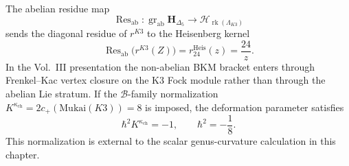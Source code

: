 \begin{remark}
The abelian residue map
\[
\operatorname{Res}_{\mathrm{ab}}\colon
\operatorname{gr}_{\mathrm{ab}}\mathbf H_{\Delta_5}
\longrightarrow \mathcal H_{\operatorname{rk}(\Lambda_{K3})}
\]
sends the diagonal residue of $r^{K3}$ to the Heisenberg kernel
\[
\operatorname{Res}_{\mathrm{ab}}\bigl(r^{K3}(Z)\bigr)
=r^{\mathrm{Heis}}_{24}(z)=\frac{24}{z}.
\]
In the Vol.~III presentation the non-abelian BKM bracket enters
through Frenkel--Kac vertex closure on the K3 Fock module rather than
through the abelian Lie stratum.  If
the $\mathcal B$-family normalization
$K^{\kappa_{\mathrm{ch}}}=2c_+(\mathrm{Mukai}(K3))=8$ is imposed, the
deformation parameter satisfies
\[
\hbar^2 K^{\kappa_{\mathrm{ch}}}=-1,
\qquad
\hbar^2=-\frac18 .
\]
This normalization is external to the scalar genus-curvature
calculation in this chapter.
\end{remark}
